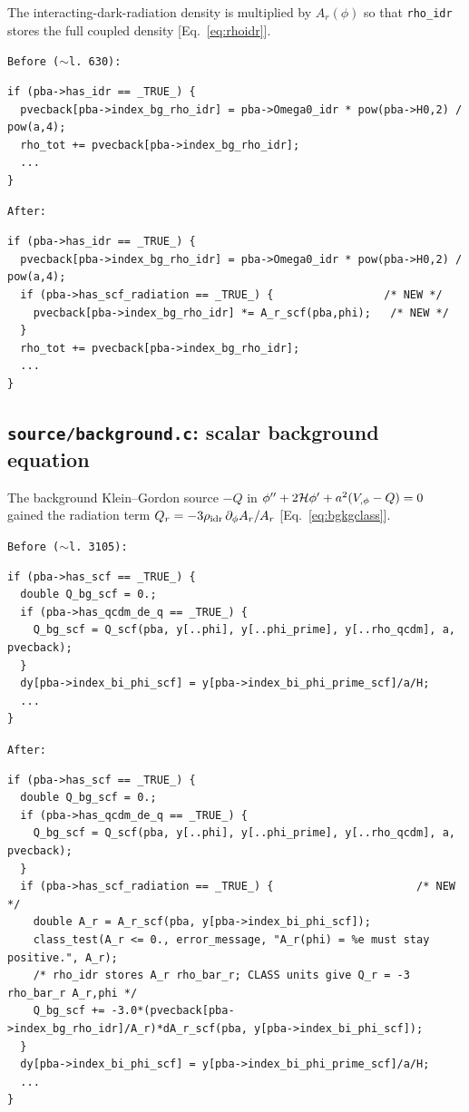 \documentclass[11pt,a4paper,english,twoside]{article}
\newcommand{\codefile}[1]{\smallskip\noindent\texttt{\small #1}\par\nopagebreak}
\def\del{\partial}
\def\cH{{\cal H}}
\begin{document}
The interacting-dark-radiation density is multiplied by $A_r(\phi)$ so that
\texttt{rho\_idr} stores the full coupled density [Eq.~\eqref{eq:rhoidr}].

\codefile{Before ($\sim$l.\,630):}
\begin{lstlisting}[style=cstyle]
if (pba->has_idr == _TRUE_) {
  pvecback[pba->index_bg_rho_idr] = pba->Omega0_idr * pow(pba->H0,2) / pow(a,4);
  rho_tot += pvecback[pba->index_bg_rho_idr];
  ...
}
\end{lstlisting}
\codefile{After:}
\begin{lstlisting}[style=cstyle]
if (pba->has_idr == _TRUE_) {
  pvecback[pba->index_bg_rho_idr] = pba->Omega0_idr * pow(pba->H0,2) / pow(a,4);
  if (pba->has_scf_radiation == _TRUE_) {                 /* NEW */
    pvecback[pba->index_bg_rho_idr] *= A_r_scf(pba,phi);   /* NEW */
  }
  rho_tot += pvecback[pba->index_bg_rho_idr];
  ...
}
\end{lstlisting}

\subsection{\texttt{source/background.c}: scalar background equation}

The background Klein--Gordon source $-Q$ in $\phi''+2\cH\phi'+a^2(V_{,\phi}-Q)=0$
gained the radiation term $Q_r=-3\rho_{\rm idr}\,\del_\phi A_r/A_r$
[Eq.~\eqref{eq:bgkgclass}].

\codefile{Before ($\sim$l.\,3105):}
\begin{lstlisting}[style=cstyle]
if (pba->has_scf == _TRUE_) {
  double Q_bg_scf = 0.;
  if (pba->has_qcdm_de_q == _TRUE_) {
    Q_bg_scf = Q_scf(pba, y[..phi], y[..phi_prime], y[..rho_qcdm], a, pvecback);
  }
  dy[pba->index_bi_phi_scf] = y[pba->index_bi_phi_prime_scf]/a/H;
  ...
}
\end{lstlisting}
\codefile{After:}
\begin{lstlisting}[style=cstyle]
if (pba->has_scf == _TRUE_) {
  double Q_bg_scf = 0.;
  if (pba->has_qcdm_de_q == _TRUE_) {
    Q_bg_scf = Q_scf(pba, y[..phi], y[..phi_prime], y[..rho_qcdm], a, pvecback);
  }
  if (pba->has_scf_radiation == _TRUE_) {                      /* NEW */
    double A_r = A_r_scf(pba, y[pba->index_bi_phi_scf]);
    class_test(A_r <= 0., error_message, "A_r(phi) = %e must stay positive.", A_r);
    /* rho_idr stores A_r rho_bar_r; CLASS units give Q_r = -3 rho_bar_r A_r,phi */
    Q_bg_scf += -3.0*(pvecback[pba->index_bg_rho_idr]/A_r)*dA_r_scf(pba, y[pba->index_bi_phi_scf]);
  }
  dy[pba->index_bi_phi_scf] = y[pba->index_bi_phi_prime_scf]/a/H;
  ...
}
\end{lstlisting}
\end{document}
